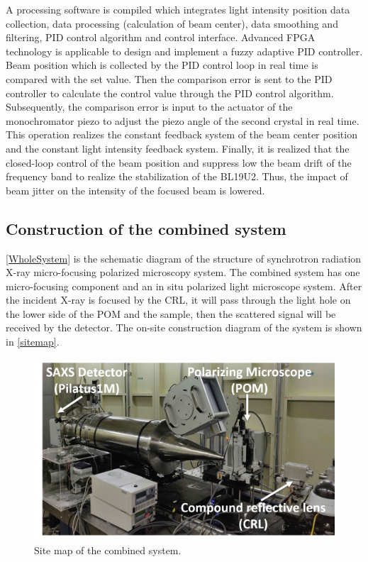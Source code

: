 \documentclass{Head}
\begin{document}
A processing software is compiled which integrates light intensity position data collection, data processing (calculation of beam center), data smoothing and filtering, PID control algorithm and control interface.
Advanced FPGA technology is applicable to design and implement a fuzzy adaptive PID controller.
Beam position which is collected by the PID control loop in real time is compared with the set value.
Then the comparison error is sent to the PID controller to calculate the control value through the PID control algorithm.
Subsequently, the comparison error is input to the actuator of the monochromator piezo to adjust the piezo angle of the second crystal in real time. This operation realizes the constant feedback system of the beam center position and the constant light intensity feedback system.
Finally, it is realized that the closed-loop control of the beam position and suppress low the beam drift of the frequency band to realize the stabilization of the BL19U2.
Thus, the impact of beam jitter on the intensity of the focused beam is lowered.
\subsection{Construction of the combined system}

\autoref{WholeSystem} is the schematic diagram of the structure of synchrotron radiation X-ray micro-focusing polarized microscopy system.
The combined system has one micro-focusing component and an in situ polarized light microscope system.
After the incident X-ray is focused by the CRL, it will pass through the light hole on the lower side of the POM and the sample, then the scattered signal will be received by the detector.
The on-site construction diagram of the system is shown in \autoref{sitemap}.
\begin{figure}
    \centering
    \includegraphics[scale=0.5]{Figures/Fig4SiteMap.png}
    \caption{Site map of the combined system.}
    \label{sitemap}
\end{figure}
\end{document}
